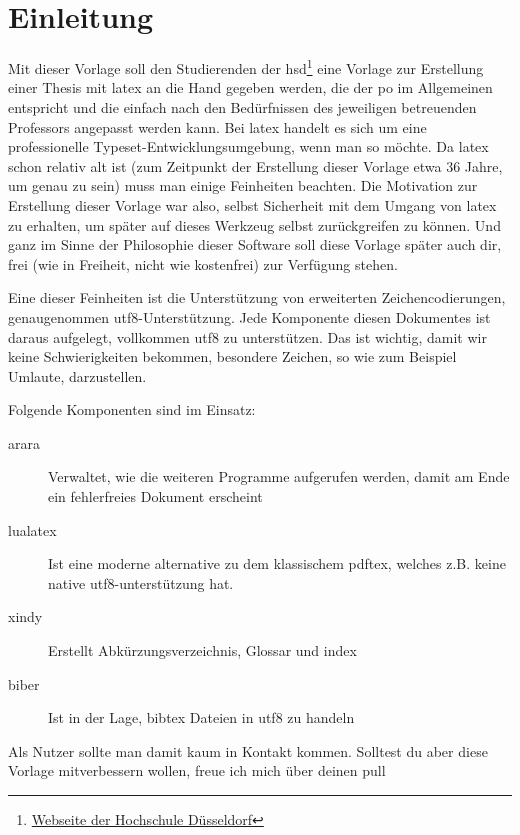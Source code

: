 \newpage

\section{Einleitung}
\label{sec:einl}
Mit dieser Vorlage soll den Studierenden der \gls{hsd}\footnote{\href{https://www.hs-duesseldorf.de}{Webseite der Hochschule Düsseldorf}} eine Vorlage zur Erstellung einer Thesis mit \gls{latex} an die Hand gegeben werden, die der \gls{po} im Allgemeinen entspricht und die einfach nach den Bedürfnissen des jeweiligen betreuenden Professors angepasst werden kann. Bei \gls{latex} handelt es sich um eine \glqq professionelle Typeset-Entwicklungsumgebung\grqq, wenn man so möchte. Da \gls{latex} schon
relativ alt ist (zum Zeitpunkt der Erstellung dieser Vorlage etwa 36 Jahre, um genau zu sein) muss man einige Feinheiten beachten. Die Motivation zur Erstellung dieser Vorlage war also, selbst Sicherheit mit dem Umgang von \gls{latex} zu erhalten, um später auf dieses Werkzeug selbst zurückgreifen zu können. Und ganz im Sinne der Philosophie dieser Software soll diese Vorlage später auch dir, frei (wie in Freiheit, nicht wie kostenfrei) zur Verfügung stehen.

Eine dieser Feinheiten ist die Unterstützung von erweiterten Zeichencodierungen, genaugenommen \gls{utf8}-Unterstützung.
Jede Komponente diesen Dokumentes ist daraus aufgelegt, vollkommen \gls{utf8} zu unterstützen. Das ist wichtig, damit wir keine Schwierigkeiten bekommen, \glqq besondere Zeichen\grqq, so wie zum Beispiel Umlaute, darzustellen.

Folgende Komponenten sind im Einsatz:
\begin{description}
  \item[arara] Verwaltet, wie die weiteren Programme aufgerufen werden, damit am Ende ein fehlerfreies Dokument erscheint
  \item[lualatex] Ist eine moderne alternative zu dem klassischem \glqq pdftex\grqq , welches z.B. keine native \gls{utf8}-unterstützung hat.
  \item[xindy] Erstellt Abkürzungsverzeichnis, Glossar und index
  \item[biber] Ist in der Lage, bibtex Dateien in \gls{utf8} zu handeln
\end{description}

Als Nutzer sollte man damit kaum in Kontakt kommen. Solltest du aber diese Vorlage mitverbessern wollen, freue ich mich über deinen \gls{pull}
